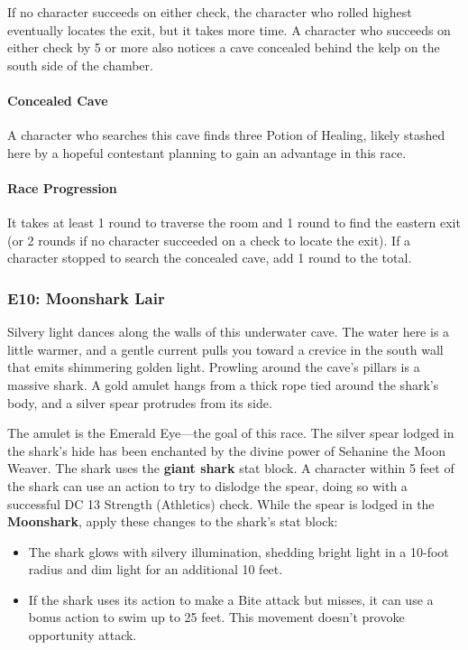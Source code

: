 \documentclass[10pt,a4,twoside,twocolumn,openany,nodeprecatedcode]{dndbook}
\begin{document}
If no character succeeds on either check, the character who rolled highest eventually locates the exit, but it takes more time. A character who succeeds on either check by 5 or more also notices a cave concealed behind the kelp on the south side of the chamber.
\paragraph{Concealed Cave}
A character who searches this cave finds three Potion of Healing, likely stashed here by a hopeful contestant planning to gain an advantage in this race.
\paragraph{Race Progression}
It takes at least 1 round to traverse the room and 1 round to find the eastern exit (or 2 rounds if no character succeeded on a check to locate the exit). If a character stopped to search the concealed cave, add 1 round to the total.
\subsubsection{E10: Moonshark Lair}
\begin{DndReadAloud}{}
Silvery light dances along the walls of this underwater cave. The water here is a little warmer, and a gentle current pulls you toward a crevice in the south wall that emits shimmering golden light. Prowling around the cave's pillars is a massive shark. A gold amulet hangs from a thick rope tied around the shark's body, and a silver spear protrudes from its side.
\end{DndReadAloud}

The amulet is the Emerald Eye—the goal of this race. The silver spear lodged in the shark's hide has been enchanted by the divine power of Sehanine the Moon Weaver. The shark uses the \textbf{giant shark} stat block. A character within 5 feet of the shark can use an action to try to dislodge the spear, doing so with a successful DC 13 Strength (Athletics) check. While the spear is lodged in the \textbf{Moonshark}, apply these changes to the shark's stat block:
\begin{itemize}

\item The shark glows with silvery illumination, shedding bright light in a 10-foot radius and dim light for an additional 10 feet.
\item If the shark uses its action to make a Bite attack but misses, it can use a bonus action to swim up to 25 feet. This movement doesn't provoke opportunity attack.
\end{itemize}
\end{document}
